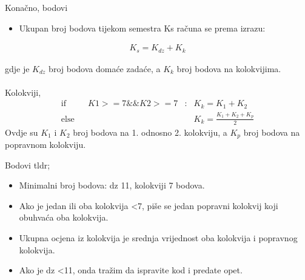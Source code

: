 \documentclass[9pt]{beamer}
\begin{document}
\begin{frame}{Konačno, bodovi}
	\begin{itemize}
		\item Ukupan broj bodova tijekom semestra Ks računa se prema izrazu:
	\end{itemize}
	\begin{align*}
	K_s = K_{dz}+ K_k
	\end{align*}

gdje je $K_{dz}$ broj bodova domaće zadaće, a $K_k$ broj bodova na kolokvijima. 
\\\hrulefill\\
Kolokviji, 
	\begin{align*}
		\textrm{if}&&  K1>=7 \&\& K2>=7 &:&          K_k = K_1 + K_2 \\
		\textrm{else}&&   &&          K_k = \frac{K_1+K_2 + K_p}{2}
	\end{align*}
Ovdje su $K_1$ i $K_2$ broj bodova na 1. odnosno 2. kolokviju, a $K_p$ broj bodova na popravnom kolokviju.

\end{frame}


\begin{frame}{Bodovi tldr;}
	\begin{block}{}
		\begin{itemize}
			\item Minimalni broj bodova: dz 11, kolokviji 7 bodova. 
			\item Ako  je jedan ili oba kolokvija <7, piše se jedan popravni kolokvij koji obuhvaća oba kolokvija. 
			\item Ukupna ocjena iz kolokvija je srednja vrijednost oba kolokvija i popravnog kolokvija. 
			\item Ako je dz <11, onda tražim da ispravite kod i predate opet.  
		\end{itemize}
	\end{block}
\end{frame}
\end{document}
